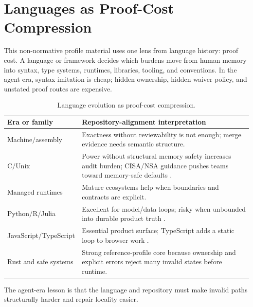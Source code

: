 \section{Languages as Proof-Cost Compression}

This non-normative profile material uses one lens from language history: proof cost. A language or framework decides which burdens move from human memory into syntax, type systems, runtimes, libraries, tooling, and conventions. In the agent era, syntax imitation is cheap; hidden ownership, hidden waiver policy, and unstated proof routes are expensive.

\begin{table}[t]
\caption{Language evolution as proof-cost compression.}
\label{tab:language-history}
\centering
\scriptsize
\begin{tabularx}{\columnwidth}{L{0.30\columnwidth} Y}
\toprule
\textbf{Era or family} & \textbf{Repository-alignment interpretation} \\
\midrule
Machine/assembly & Exactness without reviewability is not enough; merge evidence needs semantic structure. \\
C/Unix & Power without structural memory safety increases audit burden; CISA/NSA guidance pushes teams toward memory-safe defaults \cite{cisaMemorySafeLanguages2025}. \\
Managed runtimes & Mature ecosystems help when boundaries and contracts are explicit. \\
Python/R/Julia & Excellent for model/data loops; risky when unbounded into durable product truth \cite{python314Release2025}. \\
JavaScript/TypeScript & Essential product surface; TypeScript adds a static loop to browser work \cite{typescript70Beta2026}. \\
Rust and safe systems & Strong reference-profile core because ownership and explicit errors reject many invalid states before runtime. \\
\bottomrule
\end{tabularx}
\end{table}

The agent-era lesson is that the language and repository must make invalid paths structurally harder and repair locality easier.
